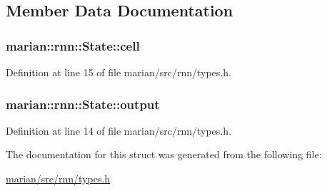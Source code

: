 \subsection{Member Data Documentation}
\subsubsection[{\texorpdfstring{cell}{cell}}]{ marian\+::rnn\+::\+State\+::cell}\hypertarget{structmarian_1_1rnn_1_1State_a4afb5d8340bcb9afd2a5de80b2771aba}{}\label{structmarian_1_1rnn_1_1State_a4afb5d8340bcb9afd2a5de80b2771aba}


Definition at line 15 of file marian/src/rnn/types.\+h.

\subsubsection[{\texorpdfstring{output}{output}}]{ marian\+::rnn\+::\+State\+::output}\hypertarget{structmarian_1_1rnn_1_1State_a299c1c1383dbccf829d7768d046fee83}{}\label{structmarian_1_1rnn_1_1State_a299c1c1383dbccf829d7768d046fee83}


Definition at line 14 of file marian/src/rnn/types.\+h.



The documentation for this struct was generated from the following file\+:\begin{DoxyCompactItemize}
\item 
\hyperlink{marian_2src_2rnn_2types_8h}{marian/src/rnn/types.\+h}\end{DoxyCompactItemize}
